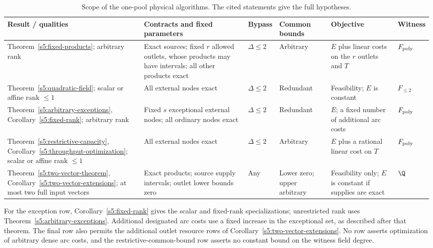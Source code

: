 \begin{table}[htbp]
\centering
\caption{Scope of the one-pool physical algorithms. The cited statements
give the full hypotheses.}
\label{s5:scope-table}
\begingroup
\footnotesize
\setlength{\tabcolsep}{3pt}
\renewcommand{\arraystretch}{1.2}
\begin{tabular}{@{}>{\raggedright\arraybackslash}p{.20\linewidth}>{\raggedright\arraybackslash}p{.27\linewidth}>{\raggedright\arraybackslash}p{.07\linewidth}>{\raggedright\arraybackslash}p{.13\linewidth}>{\raggedright\arraybackslash}p{.18\linewidth}>{\raggedright\arraybackslash}p{.08\linewidth}@{}}
\toprule
Result / qualities & Contracts and fixed parameters & Bypass & Common bounds & Objective & Witness \\
\midrule
Theorem~\ref{s5:fixed-products}; arbitrary rank
& Exact sources; fixed $r$ allowed outlets, whose products may have intervals; all other products exact
& $\Delta\le2$ & Arbitrary
& $E$ plus linear costs on the $r$ outlets and $T$ & $F_{\rm poly}$ \\
\addlinespace
Theorem~\ref{s5:quadratic-field}; scalar or affine rank $\le1$
& All external nodes exact
& $\Delta\le2$ & Redundant
& Feasibility; $E$ is constant & $F_{\le2}$ \\
\addlinespace
Theorem~\ref{s5:arbitrary-exceptions}, Corollary~\ref{s5:fixed-rank}; arbitrary rank
& Fixed $s$ exceptional external nodes; all ordinary nodes exact
& $\Delta\le2$ & Redundant
& $E$; a fixed number of additional arc costs & $F_{\rm poly}$ \\
\addlinespace
Theorem~\ref{s5:restrictive-capacity}, Corollary~\ref{s5:throughput-optimization}; scalar or affine rank $\le1$
& All external nodes exact
& $\Delta\le2$ & Arbitrary
& $E$ plus a rational linear cost on $T$ & $F_{\rm poly}$ \\
\addlinespace
Theorem~\ref{s5:two-vector-theorem}, Corollary~\ref{s5:two-vector-extensions}; at most two full input vectors
& Exact products; source supply intervals; outlet lower bounds zero
& Any & Lower zero; upper arbitrary
& Feasibility only; $E$ is constant if supplies are exact & $\Q$ \\
\bottomrule
\end{tabular}
\endgroup
\end{table}

For the exception row, Corollary~\ref{s5:fixed-rank} gives the scalar
and fixed-rank specializations; unrestricted rank uses
Theorem~\ref{s5:arbitrary-exceptions}. Additional designated arc costs
use a fixed increase in the exceptional set, as described after that
theorem. The final row also permits the additional outlet resource
rows of Corollary~\ref{s5:two-vector-extensions}. No row asserts
optimization of arbitrary dense arc costs, and the restrictive-common-bound
row asserts no constant bound on the witness field degree.

